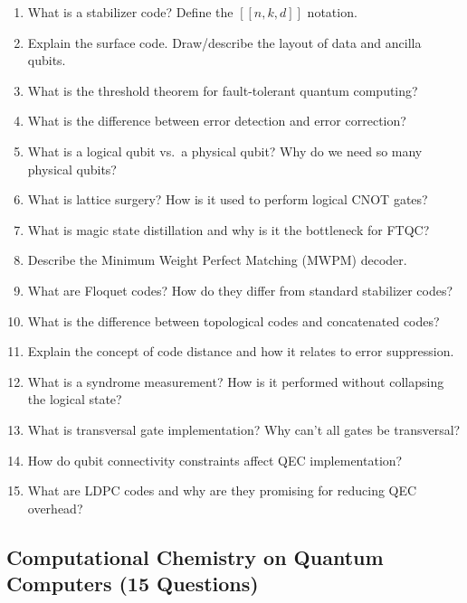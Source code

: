 \documentclass[11pt,a4paper]{article}
\begin{document}
\begin{questionbox}
\begin{enumerate}[label=\textbf{Q\arabic*.}, start=31]
    \item What is a stabilizer code? Define the $[[n,k,d]]$ notation.
    \item Explain the surface code. Draw/describe the layout of data and ancilla qubits.
    \item What is the threshold theorem for fault-tolerant quantum computing?
    \item What is the difference between error detection and error correction?
    \item What is a logical qubit vs.\ a physical qubit? Why do we need so many physical qubits?
    \item What is lattice surgery? How is it used to perform logical CNOT gates?
    \item What is magic state distillation and why is it the bottleneck for FTQC?
    \item Describe the Minimum Weight Perfect Matching (MWPM) decoder.
    \item What are Floquet codes? How do they differ from standard stabilizer codes?
    \item What is the difference between topological codes and concatenated codes?
    \item Explain the concept of code distance and how it relates to error suppression.
    \item What is a syndrome measurement? How is it performed without collapsing the logical state?
    \item What is transversal gate implementation? Why can't all gates be transversal?
    \item How do qubit connectivity constraints affect QEC implementation?
    \item What are LDPC codes and why are they promising for reducing QEC overhead?
\end{enumerate}
\end{questionbox}

\subsection{Computational Chemistry on Quantum Computers (15 Questions)}
\end{document}
